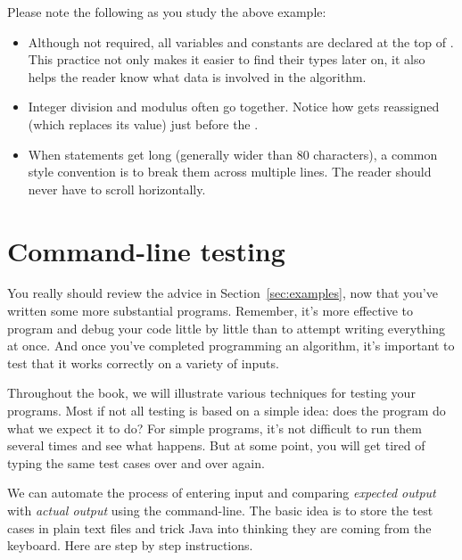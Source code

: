 Please note the following as you study the above example:

\begin{itemize}

\item Although not required, all variables and constants are declared at the top of .
This practice not only makes it easier to find their types later on, it also helps the reader know what data is involved in the algorithm.

\item Integer division and modulus often go together.
Notice how  gets reassigned (which replaces its value) just before the .

\item When statements get long (generally wider than 80 characters), a common style convention is to break them across multiple lines.
The reader should never have to scroll horizontally.

\end{itemize}



\section{Command-line testing}

You really should review the advice in Section~\ref{sec:examples}, now that you've written some more substantial programs.
Remember, it's more effective to program and debug your code little by little than to attempt writing everything at once.
And once you've completed programming an algorithm, it's important to test that it works correctly on     a variety of inputs.

Throughout the book, we will illustrate various techniques for testing your programs.
Most if not all testing is based on a simple idea: does the program do what we expect it to do?
For simple programs, it's not difficult to run them several times and see what happens.
But at some point, you will get tired of typing the same test cases over and over again.

We can automate the process of entering input and comparing {\em expected output} with {\em actual output} using the command-line.
The basic idea is to store the test cases in plain text files and trick Java into thinking they are coming from the keyboard.
Here are step by step instructions.

